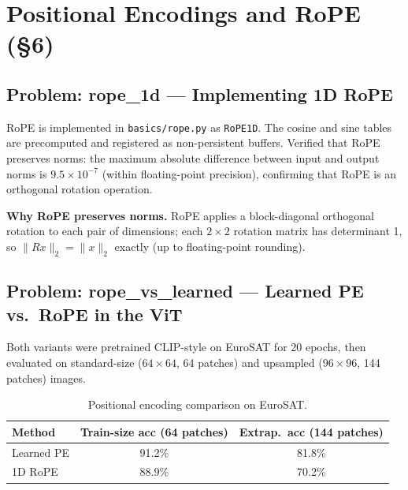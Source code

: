 \documentclass[11pt]{article}
\begin{document}
\section{Positional Encodings and RoPE (\S{}6)}

\subsection*{Problem: rope\_1d --- Implementing 1D RoPE}

RoPE is implemented in \texttt{basics/rope.py} as \texttt{RoPE1D}. The
cosine and sine tables are precomputed and registered as non-persistent
buffers. Verified that RoPE preserves norms: the maximum absolute difference
between input and output norms is $9.5\times10^{-7}$ (within floating-point
precision), confirming that RoPE is an orthogonal rotation operation.

\textbf{Why RoPE preserves norms.}
RoPE applies a block-diagonal orthogonal rotation to each pair of dimensions;
each $2\times2$ rotation matrix has determinant 1, so $\|Rx\|_2 = \|x\|_2$
exactly (up to floating-point rounding).

\subsection*{Problem: rope\_vs\_learned --- Learned PE vs.\ RoPE in the ViT}

Both variants were pretrained CLIP-style on EuroSAT for 20 epochs, then
evaluated on standard-size ($64\times64$, 64 patches) and upsampled
($96\times96$, 144 patches) images.

\begin{table}[H]
\centering
\caption{Positional encoding comparison on EuroSAT.}
\begin{tabular}{lcc}
\toprule
Method & Train-size acc (64 patches) & Extrap.\ acc (144 patches) \\
\midrule
Learned PE & 91.2\% & 81.8\% \\
1D RoPE    & 88.9\% & 70.2\% \\
\bottomrule
\end{tabular}
\end{table}
\end{document}
